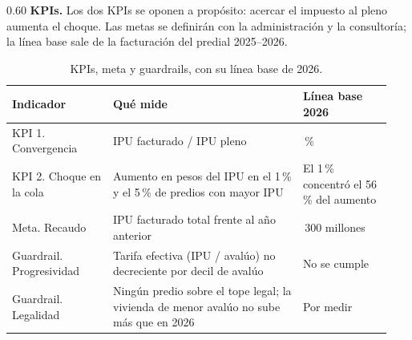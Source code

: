 \documentclass[12pt,letterpaper]{article}
\begin{document}
\begin{espacio}{0.60}
\textbf{KPIs.} Los dos KPIs se oponen a propósito: acercar el impuesto al pleno aumenta el choque.
Las metas se definirán con la administración y la consultoría; la línea base sale de la
facturación del predial 2025--2026.

\begin{table}[H]
  \centering
  \caption{KPIs, meta y guardrails, con su línea base de 2026.}
  \label{tab:kpis}
  \begin{tabular}{@{}>{\raggedright\arraybackslash}p{0.25\linewidth}
                     >{\raggedright\arraybackslash}p{0.47\linewidth}
                     >{\raggedright\arraybackslash}p{0.22\linewidth}@{}}
    \toprule
    Indicador & Qué mide & Línea base 2026 \\
    \midrule
    KPI 1. Convergencia & IPU facturado / IPU pleno & 50\,\% \\
    KPI 2. Choque en la cola & Aumento en pesos del IPU en el 1\,\% y el 5\,\% de
      predios con mayor IPU & El 1\,\% concentró el 56\,\% del aumento \\
    Meta. Recaudo & IPU facturado total frente al año anterior & 68\,300 millones \\
    Guardrail. Progresividad & Tarifa efectiva (IPU / avalúo) no decreciente por decil
      de avalúo & No se cumple \\
    Guardrail. Legalidad & Ningún predio sobre el tope legal; la vivienda de menor
      avalúo no sube más que en 2026 & Por medir \\
    \bottomrule
  \end{tabular}
\end{table}

\end{espacio}
\end{document}
